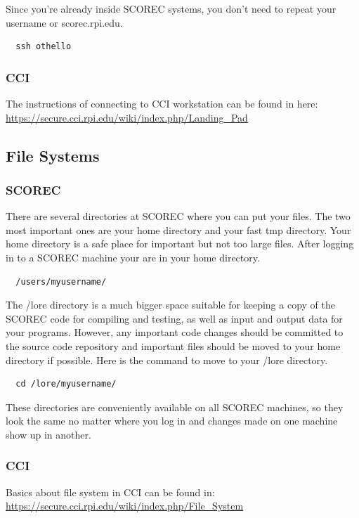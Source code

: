 \documentclass{article}
\begin{document}
Since you're already inside SCOREC systems, you don't need to repeat your username or scorec.rpi.edu.

\begin{lstlisting}
  ssh othello
\end{lstlisting}

\subsubsection{CCI}
The instructions of connecting to CCI workstation can be found in here: \\
\url{https://secure.cci.rpi.edu/wiki/index.php/Landing_Pad}

\subsection{File Systems}
\subsubsection{SCOREC}
There are several directories at SCOREC where you can put your files. The two most important ones are your home directory and your fast tmp directory. Your home directory is a safe place for important but not too large files. After logging in to a SCOREC machine your are in your home directory.
\begin{lstlisting}
  /users/myusername/
\end{lstlisting}
The /lore directory is a much bigger space suitable for keeping a copy of the SCOREC code for compiling and testing, as well as input and output data for your programs. However, any important code changes should be committed to the source code repository and important files should be moved to your home directory if possible. Here is the command to move to your /lore directory.
\begin{lstlisting}
  cd /lore/myusername/
\end{lstlisting}

These directories are conveniently available on all SCOREC machines, so they look the same no matter where you log in and changes made on one machine show up in another.

\subsubsection{CCI}
Basics about file system in CCI can be found in: \\
\url{https://secure.cci.rpi.edu/wiki/index.php/File\_System}
\end{document}
